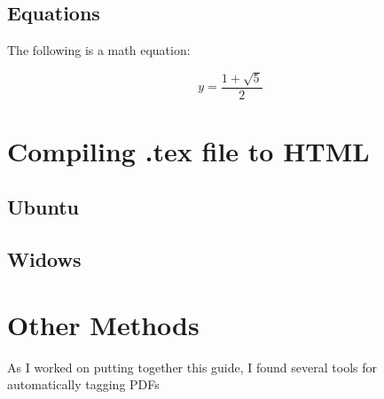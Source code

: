 \documentclass{llncs}
\begin{document}
\subsection{Equations}

The following is a math equation:

\begin{equation}
  y = \frac{1 + \sqrt{5}}{2}
\end{equation}



\section{Compiling .tex file to HTML}
\label{sec:Compiling .tex file to HTML}

\subsection{Ubuntu}


\subsection{Widows}



\section{Other Methods}

As I worked on putting together this guide, I found several tools for
automatically tagging PDFs







\end{document}
